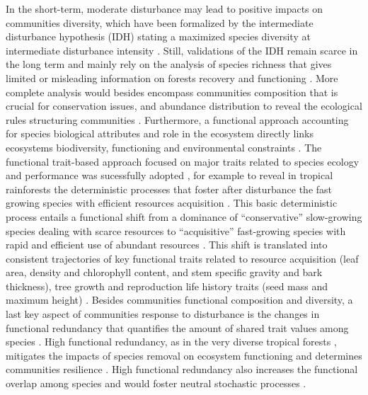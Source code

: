 \documentclass[fleqn,10pt]{ArtEcoFoG} %
\theoremstyle{definition}
\theoremstyle{definition}
\theoremstyle{definition}
\theoremstyle{remark}
\begin{document}
In the short-term, moderate disturbance may lead to positive impacts on
communities diversity, which have been formalized by the intermediate
disturbance hypothesis (IDH) stating a maximized species diversity at
intermediate disturbance intensity
\citep{Molino2001, Kariuki2006a, Berry2008a}. Still, validations of the
IDH remain scarce in the long term and mainly rely on the analysis of
species richness that gives limited or misleading information on forests
recovery and functioning \citep{Martin2015, Chaudhary2016}. More
complete analysis would besides encompass communities composition that
is crucial for conservation issues, and abundance distribution to reveal
the ecological rules structuring communities
\citep{Magurran1988, Lavorel2002, Bellwood2006}. Furthermore, a
functional approach accounting for species biological attributes and
role in the ecosystem directly links ecosystems biodiversity,
functioning and environmental constraints
\citep{Violle2007b, Moretti2009, Baraloto2012a, Scheiter2013}. The
functional trait-based approach focused on major traits related to
species ecology and performance was sucessfully adopted
\citep{Diaz2005, Villeger2008a}, for example to reveal in tropical
rainforests the deterministic processes that foster after disturbance
the fast growing species with efficient resources acquisition
\citep{Molino2001, Haddad2008, Ruger2009}. This basic deterministic
process entails a functional shift from a dominance of ``conservative''
slow-growing species dealing with scarce resources to ``acquisitive''
fast-growing species with rapid and efficient use of abundant resources
\citep{TerSteege2001, Reich2014, Herault2011}. This shift is translated
into consistent trajectories of key functional traits related to
resource acquisition (leaf area, density and chlorophyll content, and
stem specific gravity and bark thickness), tree growth and reproduction
life history traits (seed mass and maximum height)
\citep{Wright2004, TerSteege2006, Westoby2006a, Chave2009b}. Besides
communities functional composition and diversity, a last key aspect of
communities response to disturbance is the changes in functional
redundancy that quantifies the amount of shared trait values among
species \citep{Carmona2016}. High functional redundancy, as in the very
diverse tropical forests \citep{Bellwood2006}, mitigates the impacts of
species removal on ecosystem functioning and determines communities
resilience \citep{Trenbath1999, Elmqvist2003, Diaz2005}. High functional
redundancy also increases the functional overlap among species and would
foster neutral stochastic processes \citep{Gravel2006}.
\end{document}
